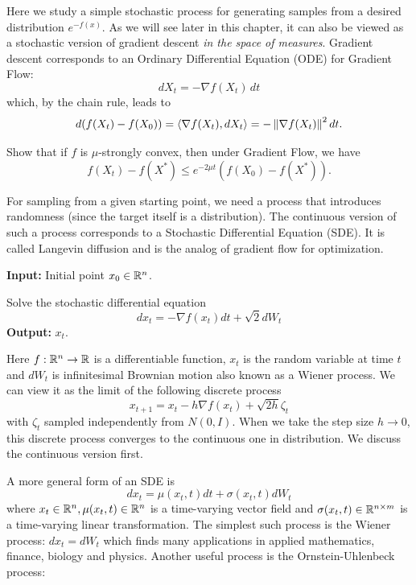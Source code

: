 Here we study a simple stochastic process for generating samples from
a desired distribution $e^{-f(x)}$. As we will see later in this
chapter, it can also be viewed as a stochastic version of gradient
descent \emph{in the space of measures}. Gradient descent corresponds
to an Ordinary Differential Equation (ODE) for Gradient Flow:
\[
dX_{t}=-\nabla f(X_{t})\,dt
\]
which, by the chain rule, leads to 
\[
d(f(X_{t})-f(X_{0}))=\langle\nabla f(X_{t}),dX_{t}\rangle=-\left\Vert \nabla f(X_{t})\right\Vert^{2}dt.
\]

\begin{xca}
Show that if $f$ is $\mu$-strongly convex, then under Gradient Flow,
we have 
\[
f(X_{t})-f(X^{*})\le e^{-2\mu t}(f(X_{0})-f(X^{*})).
\]
\end{xca}

For sampling from a given starting point, we need a process that introduces
randomness (since the target itself is a distribution). The continuous
version of such a process corresponds to a Stochastic Differential
Equation (SDE). It is called Langevin diffusion and is the analog
of gradient flow for optimization.

\begin{algorithm2e}[H]

\caption{$\mathtt{LangevinDiffusion}$ (LD)}

\SetAlgoLined

\textbf{Input:} Initial point $x_{0}\in\mathbb{R}^{n}$.

Solve the stochastic differential equation
\[
dx_{t}=-\nabla f(x_{t})dt+\sqrt{2}dW_{t}
\]
\textbf{Output:} $x_{t}$.

\end{algorithm2e}

Here $f:\mathbb{R}^{n}\rightarrow\mathbb{R}$ is a differentiable function, $x_{t}$
is the random variable at time $t$ and $dW_{t}$ is infinitesimal
Brownian motion also known as a Wiener process. We can view it as
the limit of the following discrete process 
\[
x_{t+1}=x_{t}-h\nabla f(x_{t})+\sqrt{2h}\zeta_{t}
\]
with $\zeta_{t}$ sampled independently from $N(0,I)$. When we take
the step size $h\rightarrow0$, this discrete process converges to
the continuous one in distribution. We discuss the continuous version
first.

A more general form of an SDE is 
\begin{equation}
dx_{t}=\mu(x_{t},t)dt+\sigma(x_{t},t)dW_{t}\label{eq:sde}
\end{equation}
 where $x_{t}\in\mathbb{R}^{n},\mu(x_{t},t)\in\mathbb{R}^{n}$ is a time-varying vector
field and $\sigma(x_{t},t)\in\mathbb{R}^{n\times m}$ is a time-varying linear
transformation. The simplest such process is the Wiener process: $dx_{t}=dW_{t}$
which finds many applications in applied mathematics, finance, biology
and physics. Another useful process is the Ornstein-Uhlenbeck process: 


